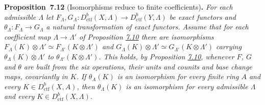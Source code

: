 \documentclass[11pt]{article}
\newenvironment{bpstatement}[2]{\par\addvspace{0.6\baselineskip}\noindent\textbf{#1}#2\textbf{.}\enspace\ignorespaces}
  {\par\addvspace{0.4\baselineskip}}
\newenvironment{bpstatementit}[2]{\begin{bpstatement}{#1}{#2}\itshape\ignorespaces}{\end{bpstatement}}
\begin{document}
\label{bp634}%
\begin{bpstatementit}{Proposition~7.12}{ (Isomorphisms reduce to finite coefficients)}
For each admissible \(\Lambda\) let \(F_\Lambda,G_\Lambda:D^b_{\mathrm{ctf}}(X,\Lambda)\to D^b_{\mathrm{ctf}}(Y,\Lambda)\) be exact functors and \(\theta_\Lambda:F_\Lambda\to G_\Lambda\) a natural transformation of exact functors. Assume that for each coefficient map \(\Lambda\to\Lambda'\) of Proposition \hyperref[bp626]{7.10} there are isomorphisms \(F_\Lambda(K)\otimes\Lambda'\simeq F_{\Lambda'}(K\otimes\Lambda')\) and \(G_\Lambda(K)\otimes\Lambda'\simeq G_{\Lambda'}(K\otimes\Lambda')\) carrying \(\theta_\Lambda(K)\otimes\Lambda'\) to \(\theta_{\Lambda'}(K\otimes\Lambda')\). This holds, by Proposition \hyperref[bp626]{7.10}, whenever \(F\), \(G\) and \(\theta\) are built from the six operations, their units and counits and base change maps, covariantly in \(K\). If \(\theta_A(K)\) is an isomorphism for every finite ring \(A\) and every \(K\in D^b_{\mathrm{ctf}}(X,A)\), then \(\theta_\Lambda(K)\) is an isomorphism for every admissible \(\Lambda\) and every \(K\in D^b_{\mathrm{ctf}}(X,\Lambda)\).
\end{bpstatementit}
\end{document}
